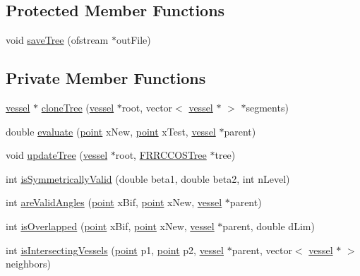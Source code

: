 \subsection*{Protected Member Functions}
\begin{DoxyCompactItemize}
\item 
void \hyperlink{class_f_r_r_c_c_o_s_tree_abd03a4c2e3080ad725a5d7a8f7c66e79}{save\+Tree} (ofstream $\ast$out\+File)
\end{DoxyCompactItemize}
\subsection*{Private Member Functions}
\begin{DoxyCompactItemize}
\item 
\hyperlink{structvessel}{vessel} $\ast$ \hyperlink{class_f_r_r_c_c_o_s_tree_aef5d8d11c6a6c054a8bfd9d8f75542ef}{clone\+Tree} (\hyperlink{structvessel}{vessel} $\ast$root, vector$<$ \hyperlink{structvessel}{vessel} $\ast$ $>$ $\ast$segments)
\item 
double \hyperlink{class_f_r_r_c_c_o_s_tree_a2e14dce4de0c9a04fe659bf7ba09935d}{evaluate} (\hyperlink{structpoint}{point} x\+New, \hyperlink{structpoint}{point} x\+Test, \hyperlink{structvessel}{vessel} $\ast$parent)
\item 
void \hyperlink{class_f_r_r_c_c_o_s_tree_ac874d76d1061662b2893b62d491e65cb}{update\+Tree} (\hyperlink{structvessel}{vessel} $\ast$root, \hyperlink{class_f_r_r_c_c_o_s_tree}{F\+R\+R\+C\+C\+O\+S\+Tree} $\ast$tree)
\item 
int \hyperlink{class_f_r_r_c_c_o_s_tree_acf03af1cd54ab2359de1cbefc437db95}{is\+Symmetrically\+Valid} (double beta1, double beta2, int n\+Level)
\item 
int \hyperlink{class_f_r_r_c_c_o_s_tree_a94b12ec6e8a68179b9cd646ab49a3ed9}{are\+Valid\+Angles} (\hyperlink{structpoint}{point} x\+Bif, \hyperlink{structpoint}{point} x\+New, \hyperlink{structvessel}{vessel} $\ast$parent)
\item 
int \hyperlink{class_f_r_r_c_c_o_s_tree_a6826a8f9cc486d98b659509f21e911c2}{is\+Overlapped} (\hyperlink{structpoint}{point} x\+Bif, \hyperlink{structpoint}{point} x\+New, \hyperlink{structvessel}{vessel} $\ast$parent, double d\+Lim)
\item 
int \hyperlink{class_f_r_r_c_c_o_s_tree_a17370e9ea2a973df943ce220b3a799a1}{is\+Intersecting\+Vessels} (\hyperlink{structpoint}{point} p1, \hyperlink{structpoint}{point} p2, \hyperlink{structvessel}{vessel} $\ast$parent, vector$<$ \hyperlink{structvessel}{vessel} $\ast$ $>$ neighbors)
\end{DoxyCompactItemize}
